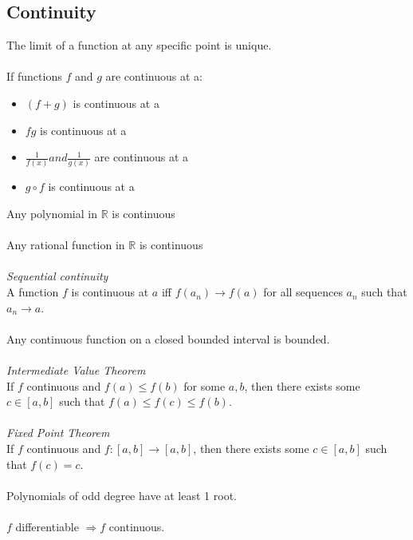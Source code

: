 \documentclass{scrartcl}
\newcommand{\R}{\mathbb{R}}
\begin{document}
\subsection{Continuity}
The limit of a function at any specific point is unique.
\\\\
If functions $ f $ and $ g $ are continuous at a:
\begin{itemize}
\item $ (f + g) $ is continuous at a
\item $ fg $ is continuous at a
\item $ \frac{1}{f(x)} and \frac{1}{g(x)} $ are continuous at a
\item $ g \circ f $ is continuous at a
\end{itemize}
Any polynomial in $ \R $ is continuous
\\\\
Any rational function in $ \R $ is continuous
\\\\
\textit{Sequential continuity}
\\
A function $ f $ is continuous at $ a $ iff $ f(a_{n}) \to f(a) $ for all sequences $ a_{n} $ such that $ a_{n} \to a $.
\\\\
Any continuous function on a closed bounded interval is bounded.
\\\\
\textit{Intermediate Value Theorem}
\\
If $ f $ continuous and $ f(a) \leq f(b) $ for some $ a, b $, then there exists some $ c \in [a, b] $ such that $ f(a) \leq f(c) \leq f(b) $.
\\\\
\textit{Fixed Point Theorem}
\\
If $ f $ continuous and $ f: [a, b] \to [a, b] $, then there exists some $ c \in [a, b] $ such that $ f(c) = c $.
\\\\
Polynomials of odd degree have at least 1 root.
\\\\
$ f $ differentiable $ \Rightarrow f $ continuous.
\end{document}
